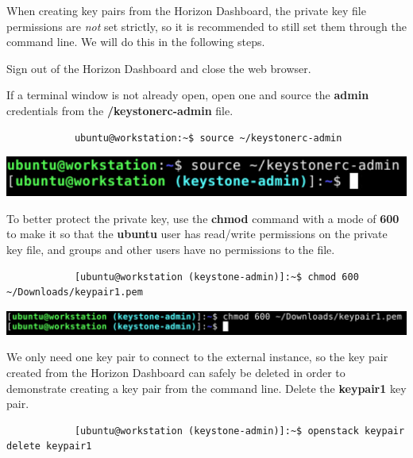 \documentclass[letterpaper, 12pt]{article}
\begin{document}
\begin{enumerate}
    \begin{tipbox}
        When creating key pairs from the Horizon Dashboard, the private key file permissions are \textit{not} set strictly, so it is recommended to still set them through the command line.
        We will do this in the following steps.
    \end{tipbox}

    \begin{labstep}
        Sign out of the Horizon Dashboard and close the web browser.
    \end{labstep}

    \begin{labstep}
        If a terminal window is not already open, open one and source the \textbf{admin} credentials from the \textbf{\texttildemid/keystonerc-admin} file.
        \begin{lstlisting}
            ubuntu@workstation:~$ source ~/keystonerc-admin
        \end{lstlisting}

        \begin{center}
            \includegraphics[width=\linewidth]{images/part7/step5.png}
        \end{center}
    \end{labstep}

    \begin{labstep}
        To better protect the private key, use the \textbf{chmod} command with a mode of \textbf{600} to make it so that the \textbf{ubuntu} user has read/write permissions on the private key file, and groups and other users have no permissions to the file.
        \begin{lstlisting}
            [ubuntu@workstation (keystone-admin)]:~$ chmod 600 ~/Downloads/keypair1.pem
        \end{lstlisting}

        \begin{center}
            \includegraphics[width=\linewidth]{images/part7/step6.png}
        \end{center}
    \end{labstep}

    \begin{labstep}
        We only need one key pair to connect to the external instance, so the key pair created from the Horizon Dashboard can safely be deleted in order to demonstrate creating a key pair from the command line.
        Delete the \textbf{keypair1} key pair.
        \begin{lstlisting}
            [ubuntu@workstation (keystone-admin)]:~$ openstack keypair delete keypair1
        \end{lstlisting}


\end{labstep}
\end{enumerate}
\end{document}
